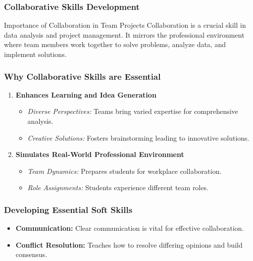 \documentclass[aspectratio=169]{beamer}
\begin{document}
\begin{frame}[fragile]
    \frametitle{Collaborative Skills Development}
    \begin{block}{Importance of Collaboration in Team Projects}
    Collaboration is a crucial skill in data analysis and project management. It mirrors the professional environment where team members work together to solve problems, analyze data, and implement solutions.
    \end{block}
\end{frame}

\begin{frame}[fragile]
    \frametitle{Why Collaborative Skills are Essential}
    \begin{enumerate}
        \item \textbf{Enhances Learning and Idea Generation}
            \begin{itemize}
                \item \textit{Diverse Perspectives:} Teams bring varied expertise for comprehensive analysis.
                \item \textit{Creative Solutions:} Fosters brainstorming leading to innovative solutions.
            \end{itemize}
            
        \item \textbf{Simulates Real-World Professional Environment}
            \begin{itemize}
                \item \textit{Team Dynamics:} Prepares students for workplace collaboration.
                \item \textit{Role Assignments:} Students experience different team roles.
            \end{itemize}
    \end{enumerate}
\end{frame}

\begin{frame}[fragile]
    \frametitle{Developing Essential Soft Skills}
    \begin{itemize}
        \item \textbf{Communication:} Clear communication is vital for effective collaboration.
        \item \textbf{Conflict Resolution:} Teaches how to resolve differing opinions and build consensus.
    \end{itemize}
\end{frame}
\end{document}
